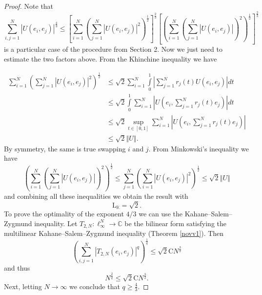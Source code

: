 \documentclass[10pt]{amsart}
\numberwithin{equation}{section}
\begin{document}
\begin{proof}
Note that\begin{equation*}
\sum\limits_{i,j=1}^{N}\left\vert U(e_{i},e_{j})\right\vert ^{\frac{4}{3}}\leq \left[ \sum\limits_{i=1}^{N}\left( \sum\limits_{j=1}^{N}\left\vert
U(e_{i},e_{j})\right\vert ^{2}\right) ^{\frac{1}{2}}\right] ^{\frac{2}{3}}\left[ \left( \sum\limits_{i=1}^{N}\left( \sum\limits_{j=1}^{N}\left\vert
U(e_{i},e_{j})\right\vert \right) ^{2}\right) ^{\frac{1}{2}}\right] ^{\frac{2}{3}}
\end{equation*}is a particular case of the procedure from Section 2. Now we just need to
estimate the two factors above. From the Khinchine inequality we have

\begin{align*}
\sum\limits_{i=1}^{N}\left( \sum\limits_{j=1}^{N}\left\vert
U(e_{i},e_{j})\right\vert ^{2}\right) ^{\frac{1}{2}}& \leq \sqrt{2}\sum\limits_{i=1}^{N}\int\limits_{0}^{1}\left\vert
\sum\limits_{j=1}^{N}r_{j}(t)U(e_{i},e_{j})\right\vert dt \\
& \leq \sqrt{2}\int\limits_{0}^{1}\sum\limits_{i=1}^{N}\left\vert
U(e_{i},\sum\limits_{j=1}^{N}r_{j}(t)e_{j})\right\vert dt \\
& \leq \sqrt{2}\sup_{t\in \left[ 0,1\right] }\sum\limits_{i=1}^{N}\left\vert
U(e_{i},\sum\limits_{j=1}^{N}r_{j}(t)e_{j})\right\vert \\
& \leq \sqrt{2}\left\Vert U\right\Vert .
\end{align*}By symmetry, the same is true swapping $i$ and $j$. From Minkowski's
inequality we have
\begin{equation*}
\left( \sum\limits_{i=1}^{N}\left( \sum\limits_{j=1}^{N}\left\vert
U(e_{i},e_{j})\right\vert \right) ^{2}\right) ^{\frac{1}{2}}\leq
\sum\limits_{j=1}^{N}\left( \sum\limits_{i=1}^{N}\left\vert
U(e_{i},e_{j})\right\vert ^{2}\right) ^{\frac{1}{2}}\leq \sqrt{2}\left\Vert
U\right\Vert
\end{equation*}
and combining all these inequalities we obtain the result with
\begin{equation*}
\mathrm{L}_{\mathbb{K}}=\sqrt{2}.
\end{equation*}To prove the optimality of the exponent $4/3$ we can use the
Kahane--Salem--Zygmund inequality. Let $T_{2,N}:\ell _{\infty
}^{N}\rightarrow \mathbb{C}$ be the bilinear form satisfying the multilinear
Kahane--Salem--Zygmund inequality (Theorem \ref{novv1}). Then\begin{equation*}
\left( \sum\limits_{i,j=1}^{N}\left\vert T_{2,N}(e_{i},e_{j})\right\vert
^{q}\right) ^{\frac{1}{q}}\leq \sqrt{2}\mathrm{C}N^{\frac{3}{2}}
\end{equation*}and thus\begin{equation*}
N^{\frac{2}{q}}\leq \sqrt{2}\mathrm{C}N^{\frac{3}{2}}.
\end{equation*}Next, letting $N\rightarrow \infty $ we conclude that $q\geq \frac{4}{3}.$
\end{proof}
\end{document}
